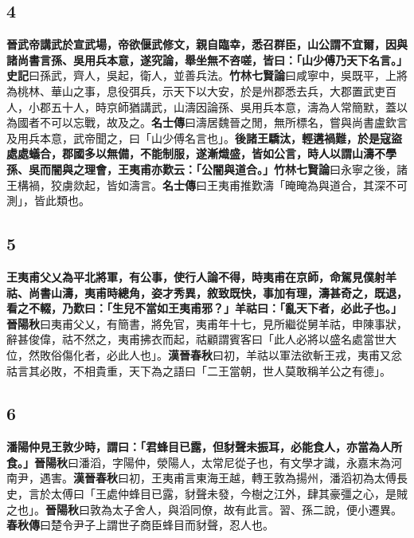 \subsection*{4}

\textbf{晉武帝講武於宣武場，帝欲偃武修文，親自臨幸，悉召群臣，山公謂不宜爾，因與諸尚書言孫、吳用兵本意，遂究論，舉坐無不咨嗟，皆曰：「山少傅乃天下名言。」}{\footnotesize \textbf{史記}曰孫武，齊人，吳起，衛人，並善兵法。\textbf{竹林七賢論}曰咸寧中，吳既平，上將為桃林、華山之事，息役弭兵，示天下以大安，於是州郡悉去兵，大郡置武吏百人，小郡五十人，時京師猶講武，山濤因論孫、吳用兵本意，濤為人常簡默，蓋以為國者不可以忘戰，故及之。\textbf{名士傳}曰濤居魏晉之閒，無所標名，嘗與尚書盧欽言及用兵本意，武帝聞之，曰「山少傅名言也」。}\textbf{後諸王驕汰，輕遘禍難，於是寇盜處處蟻合，郡國多以無備，不能制服，遂漸熾盛，皆如公言，時人以謂山濤不學孫、吳而闇與之理會，王夷甫亦歎云：「公闇與道合。」}{\footnotesize \textbf{竹林七賢論}曰永寧之後，諸王構禍，狡虜欻起，皆如濤言。\textbf{名士傳}曰王夷甫推歎濤「晻晻為與道合，其深不可測」，皆此類也。}

\subsection*{5}

\textbf{王夷甫父乂為平北將軍，有公事，使行人論不得，時夷甫在京師，命駕見僕射羊祜、尚書山濤，夷甫時總角，姿才秀異，敘致既快，事加有理，濤甚奇之，既退，看之不輟，乃歎曰：「生兒不當如王夷甫邪？」羊祜曰：「亂天下者，必此子也。」}{\footnotesize \textbf{晉陽秋}曰夷甫父乂，有簡書，將免官，夷甫年十七，見所繼從舅羊祜，申陳事狀，辭甚俊偉，祜不然之，夷甫拂衣而起，祜顧謂賓客曰「此人必將以盛名處當世大位，然敗俗傷化者，必此人也」。\textbf{漢晉春秋}曰初，羊祜以軍法欲斬王戎，夷甫又忿祜言其必敗，不相貴重，天下為之語曰「二王當朝，世人莫敢稱羊公之有德」。}

\subsection*{6}

\textbf{潘陽仲見王敦少時，謂曰：「君蜂目已露，但豺聲未振耳，必能食人，亦當為人所食。」}{\footnotesize \textbf{晉陽秋}曰潘滔，字陽仲，滎陽人，太常尼從子也，有文學才識，永嘉末為河南尹，遇害。\textbf{漢晉春秋}曰初，王夷甫言東海王越，轉王敦為揚州，潘滔初為太傅長史，言於太傅曰「王處仲蜂目已露，豺聲未發，今樹之江外，肆其豪彊之心，是賊之也」。\textbf{晉陽秋}曰敦為太子舍人，與滔同僚，故有此言。習、孫二說，便小遷異。\textbf{春秋傳}曰楚令尹子上謂世子商臣蜂目而豺聲，忍人也。}

